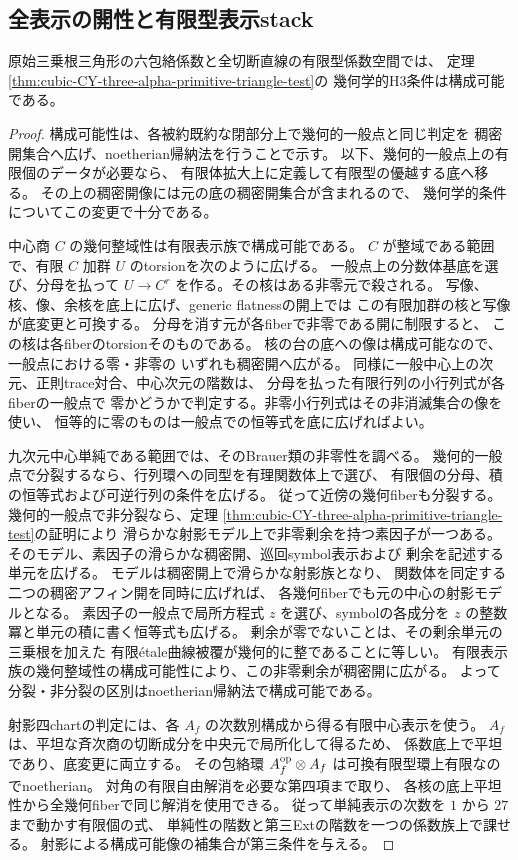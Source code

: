 \subsection{全表示の開性と有限型表示stack}
\begin{proposition}\label{prop:h3-primitive-triangle-constructible}
原始三乗根三角形の六包絡係数と全切断直線の有限型係数空間では、
定理\ref{thm:cubic-CY-three-alpha-primitive-triangle-test}の
幾何学的H3条件は構成可能である。
\end{proposition}
\begin{proof}
構成可能性は、各被約既約な閉部分上で幾何的一般点と同じ判定を
稠密開集合へ広げ、noetherian帰納法を行うことで示す。
以下、幾何的一般点上の有限個のデータが必要なら、
有限体拡大上に定義して有限型の優越する底へ移る。
その上の稠密開像には元の底の稠密開集合が含まれるので、
幾何学的条件についてこの変更で十分である。

中心商 $C$ の幾何整域性は有限表示族で構成可能である。
$C$ が整域である範囲で、有限 $C$ 加群 $U$ のtorsionを次のように広げる。
一般点上の分数体基底を選び、分母を払って
$U\to C^r$ を作る。その核はある非零元で殺される。
写像、核、像、余核を底上に広げ、generic flatnessの開上では
この有限加群の核と写像が底変更と可換する。
分母を消す元が各fiberで非零である開に制限すると、
この核は各fiberのtorsionそのものである。
核の台の底への像は構成可能なので、一般点における零・非零の
いずれも稠密開へ広がる。
同様に一般中心上の次元、正則trace対合、中心次元の階数は、
分母を払った有限行列の小行列式が各fiberの一般点で
零かどうかで判定する。非零小行列式はその非消滅集合の像を使い、
恒等的に零のものは一般点での恒等式を底に広げればよい。

九次元中心単純である範囲では、そのBrauer類の非零性を調べる。
幾何的一般点で分裂するなら、行列環への同型を有理関数体上で選び、
有限個の分母、積の恒等式および可逆行列の条件を広げる。
従って近傍の幾何fiberも分裂する。
幾何的一般点で非分裂なら、定理
\ref{thm:cubic-CY-three-alpha-primitive-triangle-test}の証明により
滑らかな射影モデル上で非零剰余を持つ素因子が一つある。
そのモデル、素因子の滑らかな稠密開、巡回symbol表示および
剰余を記述する単元を広げる。
モデルは稠密開上で滑らかな射影族となり、
関数体を同定する二つの稠密アフィン開を同時に広げれば、
各幾何fiberでも元の中心の射影モデルとなる。
素因子の一般点で局所方程式 $z$ を選び、symbolの各成分を
$z$ の整数冪と単元の積に書く恒等式も広げる。
剰余が零でないことは、その剰余単元の三乗根を加えた
有限\'{e}tale曲線被覆が幾何的に整であることに等しい。
有限表示族の幾何整域性の構成可能性により、この非零剰余が稠密開に広がる。
よって分裂・非分裂の区別はnoetherian帰納法で構成可能である。

射影四chartの判定には、各 $A_f$ の次数別構成から得る有限中心表示を使う。
$A_f$ は、平坦な斉次商の切断成分を中央元で局所化して得るため、
係数底上で平坦であり、底変更に両立する。
その包絡環 $A_f^{\rm op}\otimes A_f$ は可換有限型環上有限なのでnoetherian。
対角の有限自由解消を必要な第四項まで取り、
各核の底上平坦性から全幾何fiberで同じ解消を使用できる。
従って単純表示の次数を $1$ から $27$ まで動かす有限個の式、
単純性の階数と第三Extの階数を一つの係数族上で課せる。
射影による構成可能像の補集合が第三条件を与える。
\end{proof}

